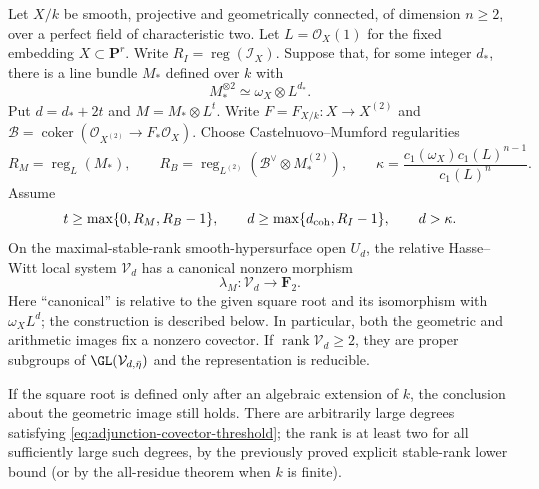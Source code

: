 \begin{theorem}\label{thm:general-adjunction-covector}
Let $X/k$ be smooth, projective and geometrically connected, of
dimension $n\geq2$, over a perfect field of characteristic two.
Let $L=\mathcal O_X(1)$ for the fixed embedding $X\subset\mathbf P^r$.
Write $R_I=\operatorname{reg}(\mathcal I_X)$.
Suppose that, for some
integer $d_*$, there is a line bundle $M_*$ defined over $k$ with
\[
 M_*^{\otimes2}\simeq\omega_X\otimes L^{d_*}.
\]
Put $d=d_*+2t$ and $M=M_*\otimes L^t$.
Write $F=F_{X/k}:X\to X^{(2)}$ and
$\mathcal B=\operatorname{coker}(\mathcal O_{X^{(2)}}\to F_*\mathcal O_X)$.
Choose Castelnuovo--Mumford regularities
\[
 R_M=\operatorname{reg}_L(M_*),\qquad
 R_B=\operatorname{reg}_{L^{(2)}}
       (\mathcal B^\vee\otimes M_*^{(2)}),
 \qquad
 \kappa=\frac{c_1(\omega_X)c_1(L)^{n-1}}{c_1(L)^n}.
\]
Assume
\begin{equation}\label{eq:adjunction-covector-threshold}
 t\geq\max\{0,R_M,R_B-1\},\qquad
 d\geq\max\{d_{\rm coh},R_I-1\},\qquad d>\kappa.
\end{equation}
On the maximal-stable-rank smooth-hypersurface open $U_d$,
the relative Hasse--Witt local system $\mathcal V_d$ has a
canonical nonzero morphism
\begin{equation}\label{eq:adjunction-invariant-covector}
 \lambda_M:\mathcal V_d\longrightarrow\mathbf F_2.
\end{equation}
Here ``canonical'' is relative to the given square root and its
isomorphism with $\omega_X L^d$; the construction is described below.
In particular, both the geometric and arithmetic images fix a
nonzero covector.  If $\operatorname{rank}\mathcal V_d\geq2$,
they are proper subgroups of $\GL(\mathcal V_{d,\bar\eta})$ and
the representation is reducible.

If the square root is defined only after an algebraic extension
of $k$, the conclusion about the geometric image still holds.
There are arbitrarily large degrees satisfying
\eqref{eq:adjunction-covector-threshold}; the rank is at least two
for all sufficiently large such degrees, by the previously proved
explicit stable-rank lower bound (or by the all-residue theorem
when $k$ is finite).
\end{theorem}

